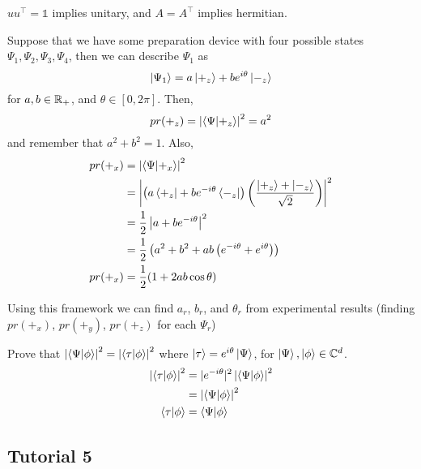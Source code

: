\documentclass[english, 11pt]{article}
\begin{document}
      \begin{note}
        $uu^\intercal = \mathbb{1}$ implies unitary, and $A = A^\intercal$ implies hermitian.
      \end{note}

      \begin{exmp}
        Suppose that we have some preparation device with four possible states $\Psi_1, \Psi_2, \Psi_3, \Psi_4$, then we can describe $\Psi_1$ as
        \[ \left|\Psi_1\right\rangle = a\left|+_z\right\rangle + be^{i\theta}\left|-_z\right\rangle \]
        for $a, b \in {\mathbb{R}}_+$, and $\theta \in [0, 2\pi]$. Then,
        \[ pr(+_z) = \left|\braket{\Psi}{+_z}\right|^2 = a^2\]
        and remember that $a^2 + b^2 = 1$. Also,
        \begin{align*}
          pr(+_x) & = \left| \braket{\Psi}{+_x} \right|^2 \\
                  & = \left| \left( a \bra{+_z}+be^{-i\theta}\bra{-_z} \right) \left( \f{\ket{+_z} + \ket{-_z}}{\sqrt{2}} \right) \right|^2 \\
                  & = \f{1}{2} \left| a + be^{-i\theta} \right|^2 \\
                  & = \f{1}{2} \left( a^2 + b^2 + ab \left( e^{-i\theta} + e^{i\theta} \right) \right) \\
          pr(+_x) & = \f{1}{2} (1 + 2ab\cos\theta)
        \end{align*}

        Using this framework we can find $a_r$, $b_r$, and $\theta_r$ from experimental results (finding $pr(+_x)$, $pr(+_y)$, $pr(+_z)$ for each $\Psi_r$)
      \end{exmp}

      \begin{exmp}
        Prove that $\left|\braket{\Psi}{\phi}\right|^2 = \left|\braket{\tau}{\phi}\right|^2$ where $\left|\tau\right\rangle = e^{i\theta} \left|\Psi\right\rangle$, for $\left|\Psi\right\rangle, \left|\phi\right\rangle \in {\mathbb{C}}^d$.
        \newline
        \begin{align*}
          \left|\braket{\tau}{\phi}\right|^2 & = |e^{-i\theta}|^2\left|\braket{\Psi}{\phi}\right|^2 \\
          & = \left|\braket{\Psi}{\phi}\right|^2 \\ \braket{\tau}{\phi} & = \braket{\Psi}{\phi}
        \end{align*}
      \end{exmp}

     \subsection{Tutorial 5}
\end{document}
